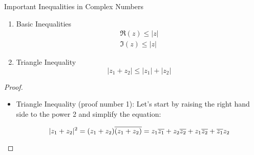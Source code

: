  
\begin{thmbox}{Important Inequalities in Complex Numbers}

	\begin{enumerate}
		\item Basic Inequalities
		\begin{align*}
			\Re(z) \leq |z| \\
			\Im(z) \leq |z|
		\end{align*}
		
		\item Triangle Inequality \[ |z_1 + z_2| \leq |z_1| + |z_2| \]
	\end{enumerate}

\end{thmbox}

\begin{proof}
	\ \\
	\begin{itemize}
	\item Triangle Inequality (proof number 1): Let's start by raising the right hand side to the power 2 and simplify the equation:
	
	\[ |z_1 + z_2|^2 = (z_1 + z_2) \overline{(z_1 + z_2)} = z_1 \overline{z_1} + z_2 \overline{z_2} + z_1 \overline{z_2} + \overline{z_1} z_2 \]
	
	\end{itemize}
\end{proof}


